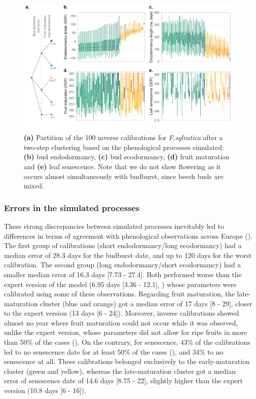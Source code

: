\begin{figure}[htpb]
\centering
\begin{subcaptiongroup}
\label{fig:2A} 
\label{fig:2B}
\label{fig:2C}
\label{fig:2D}
\label{fig:2E}
\end{subcaptiongroup}
\includegraphics{chapter3/figs/fig2-1.pdf}
\caption{\textbf{(a)} Partition of the 100 inverse calibrations for \emph{F.sylvatica} after a two-step clustering based on the phenological processes simulated: \textbf{(b)} bud endodormancy, \textbf{(c)} bud ecodormancy, \textbf{(d)} fruit maturation and \textbf{(e)} leaf senescence. Note that we do not show flowering as it occurs almost simultaneously with budburst, since beech buds are mixed.}
\label{fig:2}
\end{figure}

\subsubsection{Errors in the simulated processes}

These strong discrepancies between simulated processes inevitably led to differences in terms of agreement with phenological observations across Europe (). The first group of calibrations (short endodormancy/long ecodormancy) had a median error of 28.3 days for the budburst date, and up to 120 days for the worst calibration. The second group (long endodormancy/short ecodormancy) had a smaller median error of 16.3 days [7.73 - 27.4]. Both performed worse than the expert version of the model (6.95 days [3.36 - 12.1], ) whose parameters were calibrated using some of these observations. Regarding fruit maturation, the late-maturation cluster (blue and orange) got a median error of 17 days [8 - 29], closer to the expert version (13 days [6 - 24]). Moreover, inverse calibrations showed almost no year where fruit maturation could not occur while it was observed, unlike the expert version, whose parameters did not allow for ripe fruits in more than 50\% of the cases (). On the contrary, for senescence, 43\% of the calibrations led to no senescence date for at least 50\% of the cases (), and 34\% to no senescence at all. These calibrations belonged exclusively to the early-maturation cluster (green and yellow), whereas the late-maturation cluster got a median error of senescence date of 14.6 days [8.75 - 22], slightly higher than the expert version (10.8 days [6 - 16]).

